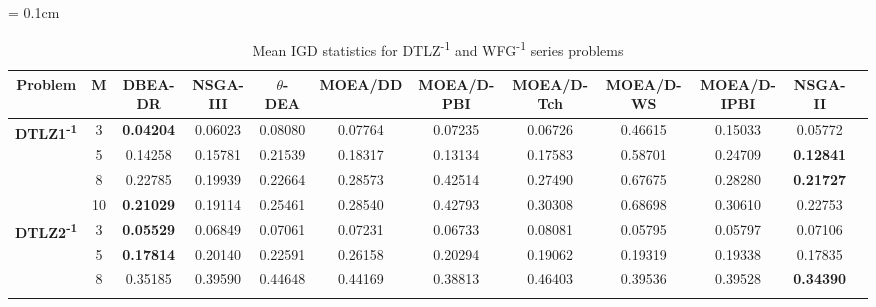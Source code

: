 \documentclass{sig-alternate}
\begin{document}
\begin{table*}[!htb]\scriptsize
	\centering
	\renewcommand{\arraystretch}{0.9}
	\caption{Mean IGD statistics for DTLZ\textsuperscript{-1} and WFG\textsuperscript{-1} series problems}
	\label{tab:IGDminus}
	\tabcolsep = 0.1cm
	\begin{tabular}{|c|c|c|c|c|c|c|c|c|c|c|c|}
		\noalign{\smallskip}\hline
		\textbf{Problem}                                      & \textbf{M} & \textbf{DBEA-DR} & \textbf{NSGA-III} & \textbf{$\theta$-DEA} & \textbf{MOEA/DD} & \textbf{MOEA/D-PBI} & \textbf{MOEA/D-Tch} & \textbf{MOEA/D-WS} & \textbf{MOEA/D-IPBI} & \textbf{NSGA-II} \\ \hline
\multirow{4}{*}{\textbf{DTLZ1\textsuperscript{-1}}} & 3          & \textbf{0.04204} & 0.06023           & 0.08080               & 0.07764          & 0.07235             & 0.06726             & 0.46615            & 0.15033              & 0.05772          \\ \cline{2-11} 
                                                      & 5          & 0.14258          & 0.15781           & 0.21539               & 0.18317          & 0.13134             & 0.17583             & 0.58701            & 0.24709              & \textbf{0.12841} \\ \cline{2-11} 
                                                      & 8          & 0.22785          & 0.19939           & 0.22664               & 0.28573          & 0.42514             & 0.27490             & 0.67675            & 0.28280              & \textbf{0.21727} \\ \cline{2-11} 
                                                      & 10         & \textbf{0.21029} & 0.19114           & 0.25461               & 0.28540          & 0.42793             & 0.30308             & 0.68698            & 0.30610              & 0.22753          \\ \hline
\multirow{4}{*}{\textbf{DTLZ2\textsuperscript{-1}}} & 3          & \textbf{0.05529} & 0.06849           & 0.07061               & 0.07231          & 0.06733             & 0.08081             & 0.05795            & 0.05797              & 0.07106          \\ \cline{2-11} 
                                                      & 5          & \textbf{0.17814} & 0.20140           & 0.22591               & 0.26158          & 0.20294             & 0.19062             & 0.19319            & 0.19338              & 0.17835          \\ \cline{2-11} 
                                                      & 8          & 0.35185          & 0.39590           & 0.44648               & 0.44169          & 0.38813             & 0.46403             & 0.39536            & 0.39528              & \textbf{0.34390} \\ \cline{2-11} 

\end{tabular}
\end{table*}
\end{document}
